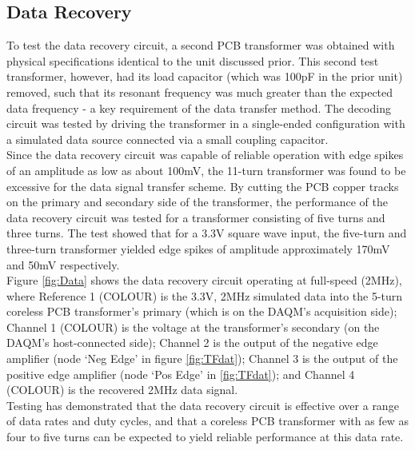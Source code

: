\documentclass[conference]{IEEEtran}
\begin{document}
	\subsection{Data Recovery}
	To test the data recovery circuit, a second PCB transformer was obtained with physical specifications identical to the unit discussed prior.  This second test transformer, however, had its load capacitor (which was 100pF in the prior unit) removed, such that its resonant frequency was much greater than the expected data frequency - a key requirement of the data transfer method.  The decoding circuit was tested by driving the transformer in a single-ended configuration with a simulated data source connected via a small coupling capacitor.  \\
	Since the data recovery circuit was capable of reliable operation with edge spikes of an amplitude as low as about 100mV, the 11-turn transformer was found to be excessive for the data signal transfer scheme.  By cutting the PCB copper tracks on the primary and secondary side of the transformer, the performance of the data recovery circuit was tested for a transformer consisting of five turns and three turns.  The test showed that for a 3.3V square wave input, the five-turn and three-turn transformer yielded edge spikes of amplitude approximately 170mV and 50mV respectively.\\
	Figure \ref{fig:Data} shows the data recovery circuit operating at full-speed (2MHz), where Reference 1 (COLOUR) is the 3.3V, 2MHz simulated data into the 5-turn coreless PCB transformer's primary (which is on the DAQM's acquisition side); Channel 1 (COLOUR) is the voltage at the transformer's secondary (on the DAQM's host-connected side); Channel 2 is the output of the negative edge amplifier (node `Neg Edge' in figure \ref{fig:TFdat}); Channel 3 is the output of the positive edge amplifier (node `Pos Edge' in \ref{fig:TFdat}); and Channel 4 (COLOUR) is the recovered 2MHz data signal. \\
	Testing has demonstrated that the data recovery circuit is effective over a range of data rates and duty cycles, and that a coreless PCB transformer with as few as four to five turns can be expected to yield reliable performance at this data rate.
	
\end{document}
